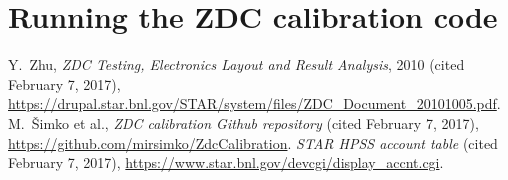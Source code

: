 \documentclass[a4paper,10pt]{report}
\begin{document}
\chapter{Running the ZDC calibration code}


\begin{thebibliography}{9}
  Y.\ Zhu, \textit{ZDC Testing, Electronics Layout and Result Analysis}, 2010
 (cited February 7, 2017),
 \url{https://drupal.star.bnl.gov/STAR/system/files/ZDC_Document_20101005.pdf}.
  M.\ Šimko et al., \textit{ZDC calibration Github repository}
 (cited February 7, 2017), \url{https://github.com/mirsimko/ZdcCalibration}.
  \textit{STAR HPSS account table} (cited February 7, 2017),
 \url{https://www.star.bnl.gov/devcgi/display_accnt.cgi}.
\end{thebibliography}
\end{document}
